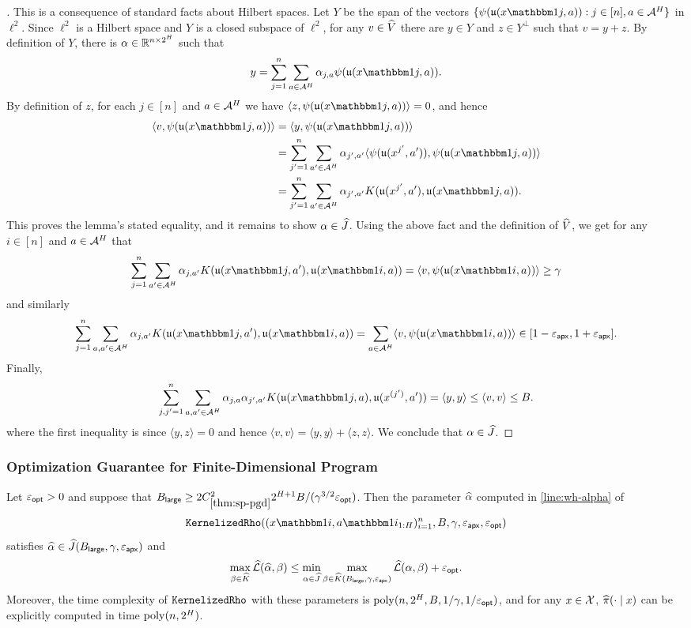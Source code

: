 \begin{proof}[]
This is a consequence of standard facts about Hilbert spaces. Let $Y$ be the span of the vectors $\{\psi(\uop{x\ind{j}}{a}): j \in [n], a \in \MA^H\}$ in $\ell^2$. Since $\ell^2$ is a Hilbert space and $Y$ is a closed subspace of $\ell^2$, for any $v \in \widehat{V}$ there are $y \in Y$ and $z \in Y^\perp$ such that $v=y+z$. By definition of $Y$, there is $\alpha \in \mathbb{R}^{n \times 2^H}$ such that 
\[y = \sum_{j=1}^n \sum_{a \in \MA^H} \alpha_{j,a} \psi(\uop{x\ind{j}}{a}).\]
By definition of $z$, for each $j \in [n]$ and $a \in \mathcal{A}^H$ we have $\langle z, \psi(\uop{x\ind{j}}{a})\rangle = 0$, and hence
\begin{align}
\langle v, \psi(\uop{x\ind{j}}{a})\rangle
&= \langle y, \psi(\uop{x\ind{j}}{a})\rangle \\ 
&= \sum_{j'=1}^n \sum_{a'\in\MA^H} \alpha_{j',a'} \langle \psi(\uop{x^{j'}}{a'}), \psi(\uop{x\ind{j}}{a})\rangle \\  
&= \sum_{j'=1}^n \sum_{a'\in\MA^H} \alpha_{j',a'} K(\uop{x^{j'}}{a'},\uop{x\ind{j}}{a}).
\end{align}
This proves the lemma's stated equality, and it remains to show $\alpha \in \widehat{J}$. Using the above fact and the definition of $\widehat{V}$, we get for any $i \in [n]$ and $a \in \mathcal{A}^H$ that 
\[\sum_{j=1}^n \sum_{a' \in \MA^H} \alpha_{j,a'} K(\uop{x\ind{j}}{a'},\uop{x\ind{i}}{a}) = \langle v, \psi(\uop{x\ind{i}}{a})\rangle \geq \gamma\]
and similarly
\[\sum_{j=1}^n \sum_{a,a' \in \MA^H} \alpha_{j,a'} K(\uop{x\ind{j}}{a'},\uop{x\ind{i}}{a}) = \sum_{a \in \MA^H} \langle v, \psi(\uop{x\ind{i}}{a})\rangle \in [1-\epapx,1+\epapx].\]
Finally,
\[\sum_{j,j'=1}^n \sum_{a,a' \in \MA^H} \alpha_{j,a}\alpha_{j',a'}K(\uop{x\ind{j}}{a},\uop{x^{(j')}}{a'}) = \langle y,y\rangle \leq \langle v,v\rangle \leq B.\]
where the first inequality is since $\langle y,z\rangle = 0$ and hence $\langle v,v\rangle = \langle y,y\rangle + \langle z,z\rangle$. We conclude that $\alpha \in \widehat{J}$.
\end{proof}




\subsubsection{Optimization Guarantee for Finite-Dimensional Program}




\begin{lemma}\label{lemma:optimization-loss-guarantee}
Let $\varepsilon_{\mathsf{opt}}>0$ and suppose that $B_{\mathsf{large}} \geq 2C_{\ref{thm:sp-pgd}}^2 2^{H+1}B/(\gamma^{3/2}\varepsilon_{\mathsf{opt}})$. Then the parameter $\widehat{\alpha}$ computed in \cref{line:wh-alpha} of \[\KernRho((x\ind{i},a\ind{i}_{1:H})_{i=1}^n, B,\gamma,\epapx,\epopt)\] satisfies $\widehat{\alpha} \in \widehat{J}(B_{\mathsf{large}},\gamma,\varepsilon_{\mathsf{apx}})$ and
\[\max_{\beta \in \widehat{K}} \mathcal{\widehat{L}}(\widehat{\alpha}, \beta) \leq \min_{\alpha \in \widehat{J}} \max_{\beta \in \widehat{K}(B_{\mathsf{large}},\gamma,\varepsilon_{\mathsf{apx}})} \mathcal{\widehat{L}}( \alpha, \beta) + \varepsilon_{\mathsf{opt}}.\]
Moreover, the time complexity of $\texttt{KernelizedRho}$ with these parameters is $\mathrm{poly}(n,2^H,B,1/\gamma,1/\varepsilon_{\mathsf{opt}})$, and for any $x\in\mathcal{X}$, $\widehat{\pi}(\cdot\mid{}x)$ can be explicitly computed in time $\mathrm{poly}(n,2^H)$.
\end{lemma}

